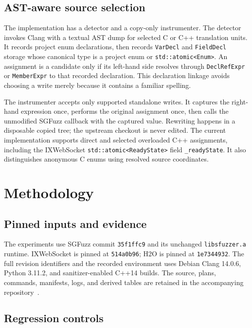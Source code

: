 \documentclass[conference]{IEEEtran}
\begin{document}
\subsection{AST-aware source selection}

The implementation has a detector and a copy-only instrumenter. The detector
invokes Clang with a textual AST dump for selected C or C++ translation units.
It records project enum declarations, then records \texttt{VarDecl} and
\texttt{FieldDecl} storage whose canonical type is a project enum or
\texttt{std::atomic<Enum>}. An assignment is a candidate only if its left-hand
side resolves through \texttt{DeclRefExpr} or \texttt{MemberExpr} to that
recorded declaration. This declaration linkage avoids choosing a write merely
because it contains a familiar spelling.

The instrumenter accepts only supported standalone writes. It captures the
right-hand expression once, performs the original assignment once, then calls
the unmodified SGFuzz callback with the captured value. Rewriting happens in a
disposable copied tree; the upstream checkout is never edited. The current
implementation supports direct and selected overloaded C++ assignments,
including the IXWebSocket \texttt{std::atomic<ReadyState>} field
\texttt{\_readyState}. It also distinguishes anonymous C enums using resolved
source coordinates.

\section{Methodology}

\subsection{Pinned inputs and evidence}

The experiments use SGFuzz commit \texttt{35f1ffc9} and its unchanged
\texttt{libsfuzzer.a} runtime. IXWebSocket is pinned at \texttt{514a0b96};
H2O is pinned at \texttt{1e7344932}. The full revision identifiers and the
recorded environment
uses Debian Clang 14.0.6, Python 3.11.2, and sanitizer-enabled C++14 builds.
The source, plans, commands, manifests, logs, and derived tables are retained
in the accompanying repository~\cite{artifact}.

\subsection{Regression controls}
\end{document}
